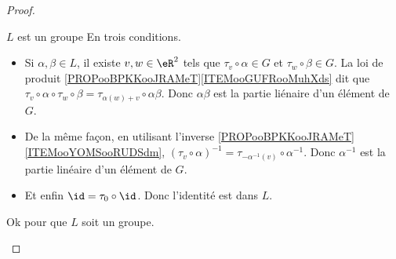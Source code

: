 \begin{proof}
\begin{subproof}
        \item[\( L\) est un groupe]
            En trois conditions.
            \begin{itemize}
                \item 
                    Si \( \alpha,\beta\in L\), il existe \( v,w\in \eR^2\) tels que \( \tau_v\circ \alpha\in G\) et \( \tau_w\circ \beta\in G\). La loi de produit \ref{PROPooBPKKooJRAMeT}\ref{ITEMooGUFRooMuhXds} dit que \( \tau_v\circ \alpha\circ\tau_w\circ \beta=\tau_{\alpha(w)+v}\circ \alpha\beta\). Donc \( \alpha\beta\) est la partie liénaire d'un élément de \( G\). 
                \item
                    De la même façon, en utilisant l'inverse \ref{PROPooBPKKooJRAMeT}\ref{ITEMooYOMSooRUDSdm}, \( (\tau_v\circ\alpha)^{-1}= \tau_{-\alpha^{-1}(v)}\circ \alpha^{-1}   \). Donc \( \alpha^{-1}\) est la partie linéaire d'un élément de \( G\).
                \item
                    Et enfin \( \id=\tau_0\circ \id\). Donc l'identité est dans \( L\).
            \end{itemize}
            Ok pour que \( L\) soit un groupe.


\end{subproof}
\end{proof}
